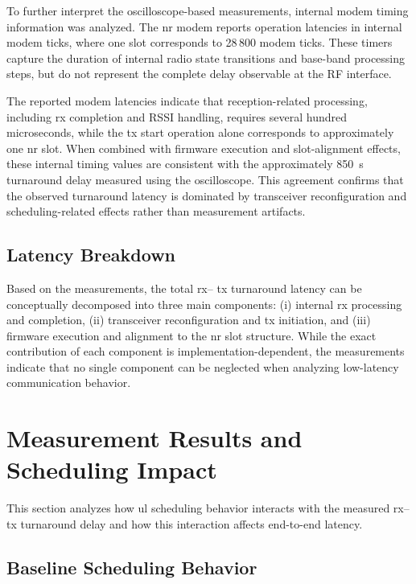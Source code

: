 \documentclass[conference]{IEEEtran}
\begin{document}
To further interpret the oscilloscope-based measurements, internal modem timing information was analyzed. The \gls{nr} modem reports operation latencies in internal modem ticks, where one slot corresponds to 28\,800 modem ticks. These timers capture the duration of internal radio state transitions and base-band processing steps, but do not represent the complete delay observable at the RF interface.

The reported modem latencies indicate that reception-related processing, including  \gls{rx} completion and RSSI handling, requires several hundred microseconds, while the  \gls{tx} start operation alone corresponds to approximately one \gls{nr} slot. When combined with firmware execution and slot-alignment effects, these internal timing values are consistent with the approximately 850~\textmu s turnaround delay measured using the oscilloscope. This agreement confirms that the observed turnaround latency is dominated by transceiver reconfiguration and scheduling-related effects rather than measurement artifacts.

\subsection{Latency Breakdown}

Based on the measurements, the total  \gls{rx}-- \gls{tx} turnaround latency can be conceptually decomposed into three main components: (i) internal  \gls{rx} processing and completion, (ii) transceiver reconfiguration and  \gls{tx} initiation, and (iii) firmware execution and alignment to the \gls{nr} slot structure. While the exact contribution of each component is implementation-dependent, the measurements indicate that no single component can be neglected when analyzing low-latency communication behavior.


\section{Measurement Results and Scheduling Impact}

This section analyzes how \gls{ul} scheduling behavior interacts with the measured  \gls{rx}-- \gls{tx} turnaround delay and how this interaction affects end-to-end latency.

\subsection{Baseline Scheduling Behavior}
\end{document}
